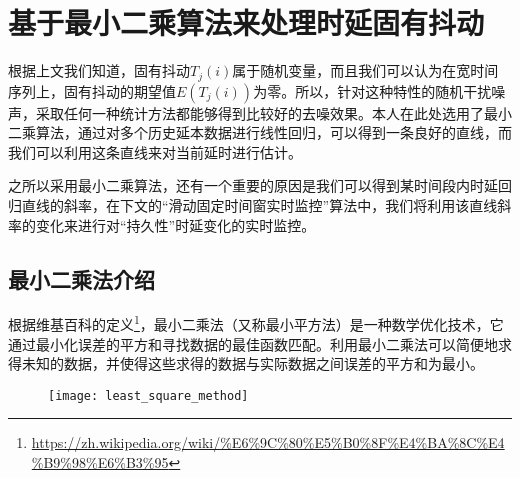\section{基于最小二乘算法来处理时延固有抖动}
根据上文我们知道，固有抖动$T_{j}(i)$属于随机变量，而且我们可以认为在宽时间序列上，固有抖动的期望值$E(T_{j}(i))$为零。所以，针对这种特性的随机干扰噪声，采取任何一种统计方法都能够得到比较好的去噪效果。本人在此处选用了最小二乘算法，通过对多个历史延本数据进行线性回归，可以得到一条良好的直线，而我们可以利用这条直线来对当前延时进行估计。

之所以采用最小二乘算法，还有一个重要的原因是我们可以得到某时间段内时延回归直线的斜率，在下文的“滑动固定时间窗实时监控”算法中，我们将利用该直线斜率的变化来进行对“持久性”时延变化的实时监控。

\subsection{最小二乘法介绍}
根据维基百科的定义\footnote{\url{https://zh.wikipedia.org/wiki/\%E6\%9C\%80\%E5\%B0\%8F\%E4\%BA\%8C\%E4\%B9\%98\%E6\%B3\%95}}，最小二乘法（又称最小平方法）是一种数学优化技术，它通过最小化误差的平方和寻找数据的最佳函数匹配。利用最小二乘法可以简便地求得未知的数据，并使得这些求得的数据与实际数据之间误差的平方和为最小。

\begin{figure}[!hbp]
  \centering
  \begin{minipage}[b]{0.6\textwidth}
    \captionstyle{\centering}
    \centering
    \texttt{[image: least\_square\_method]}
  \end{minipage}     
\end{figure}

